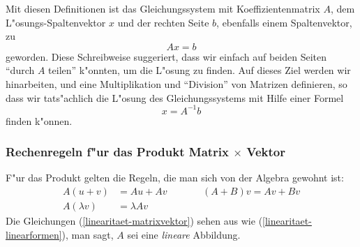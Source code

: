 Mit diesen Definitionen ist das Gleichungssystem mit Koeffizientenmatrix $A$,
dem L"osungs-Spaltenvektor $x$ und der rechten Seite $b$, ebenfalls einem
Spaltenvektor, zu
\[
Ax=b
\]
geworden.
Diese Schreibweise suggeriert, dass wir einfach auf beiden
Seiten ``durch $A$ teilen'' k"onnten, um die L"osung zu finden.
Auf dieses
Ziel werden wir hinarbeiten, und eine Multiplikation und ``Division''
von Matrizen definieren, so dass wir tats"achlich die L"osung des Gleichungssystems
mit Hilfe einer Formel
\[
x=A^{-1}b
\]
finden k"onnen.

\subsubsection{Rechenregeln f"ur das Produkt Matrix $\times$ Vektor}
F"ur das Produkt gelten die Regeln, die man sich von der Algebra 
gewohnt ist:
\begin{equation}
\begin{aligned}
A(u+v)&=Au+Av&\qquad&(A+B)v=Av+Bv\\
A(\lambda v)&=\lambda Av
\end{aligned}
\label{linearitaet-matrixvektor}
\end{equation}
Die Gleichungen (\ref{linearitaet-matrixvektor}) sehen aus wie
(\ref{linearitaet-linearformen}),
man sagt, $A$ sei eine {\em lineare} Abbildung.


